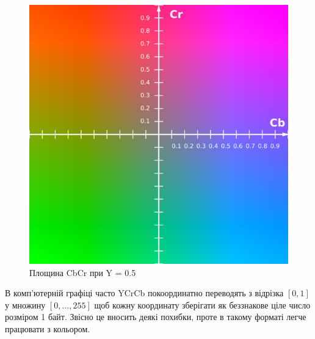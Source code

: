 \begin{figure}[H]
	\centering
	\includegraphics[width=0.7\linewidth]{theory/img/ycrcb_representation}
	\caption{Площина CbCr при Y = 0.5}
	\label{fig:ycrcb_representation}
\end{figure}

В комп'ютерній графіці часто YCrCb покоординатно переводять з відрізка $[0,1]$ у множину $[0,...,255]$ щоб кожну координату зберігати як беззнакове ціле число розміром 1 байт. Звісно це вносить деякі похибки, проте в такому форматі легче працювати з кольором.